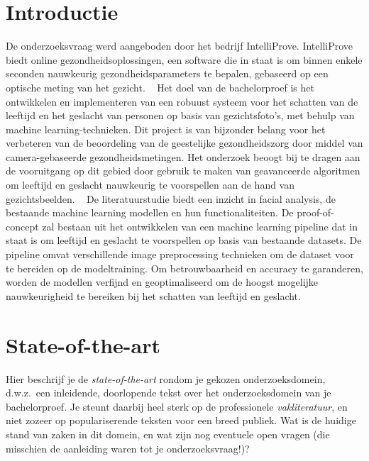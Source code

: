 
\section{Introductie}%
\label{sec:introductie}

De onderzoeksvraag werd aangeboden door het bedrijf IntelliProve. IntelliProve biedt online gezondheidsoplossingen, een software die in staat is om binnen enkele seconden nauwkeurig gezondheidsparameters te bepalen, gebaseerd op een optische meting van het gezicht.  
Het doel van de bachelorproef is het ontwikkelen en implementeren van een robuust systeem voor het schatten van de leeftijd en het geslacht van personen op basis van gezichtsfoto's, met behulp van machine learning-technieken. 
Dit project is van bijzonder belang voor het verbeteren van de beoordeling van de geestelijke gezondheidszorg door middel van camera-gebaseerde gezondheidsmetingen. Het onderzoek beoogt bij te dragen aan de vooruitgang op dit gebied door gebruik te maken van geavanceerde algoritmen om leeftijd en geslacht nauwkeurig te voorspellen aan de hand van gezichtsbeelden.  
De literatuurstudie biedt een inzicht in facial analysis, de bestaande machine learning modellen en hun functionaliteiten. De proof-of-concept zal bestaan uit het ontwikkelen van een machine learning pipeline dat in staat is om leeftijd en geslacht te voorspellen op basis van bestaande datasets. De pipeline omvat verschillende image preprocessing technieken om de dataset voor te bereiden op de modeltraining. Om betrouwbaarheid en accuracy te garanderen, worden de modellen verfijnd en geoptimaliseerd om de hoogst mogelijke nauwkeurigheid te bereiken bij het schatten van leeftijd en geslacht.

\section{State-of-the-art}%
\label{sec:state-of-the-art}

Hier beschrijf je de \emph{state-of-the-art} rondom je gekozen onderzoeksdomein, d.w.z.\ een inleidende, doorlopende tekst over het onderzoeksdomein van je bachelorproef. Je steunt daarbij heel sterk op de professionele \emph{vakliteratuur}, en niet zozeer op populariserende teksten voor een breed publiek. Wat is de huidige stand van zaken in dit domein, en wat zijn nog eventuele open vragen (die misschien de aanleiding waren tot je onderzoeksvraag!)?

